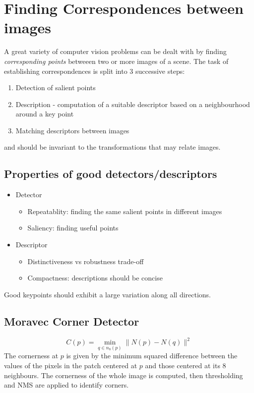 \documentclass{article}
\begin{document}
\section{Finding Correspondences between images}
A great variety of computer vision problems can be dealt with by finding \emph{corresponding points} betweeen two or more images of a scene. The task of establishing correspondences is split into 3 successive steps: 
\begin{enumerate}
    \item Detection of salient points
    \item Description - computation of a suitable descriptor based on a neighbourhood around a key point 
    \item Matching descriptors between images
\end{enumerate}
and should be invariant to the transformations that may relate images. 
\subsection{Properties of good detectors/descriptors}

\begin{itemize}
  \item Detector \begin{itemize}
      \item Repeatablity: finding the same salient points in different images 
      \item Saliency: finding useful points 
    \end{itemize}
  \item Descriptor \begin{itemize}
      \item Distinctiveness vs robustness trade-off
      \item Compactness: descriptions should be concise
    \end{itemize}
\end{itemize}
Good keypoints should exhibit a large variation along all directions. 
\subsection{Moravec Corner Detector}
\[
  C(p) = \min_{q\in n_8(p)} \|N(p)-N(q)\|^2 
\]
The cornerness at $p$ is given by the minimum squared difference between the values of the pixels in the patch centered at $p$ and those centered at its 8 neighbours. The cornerness of the whole image is computed, then thresholding and NMS are applied to identify corners.
\end{document}
